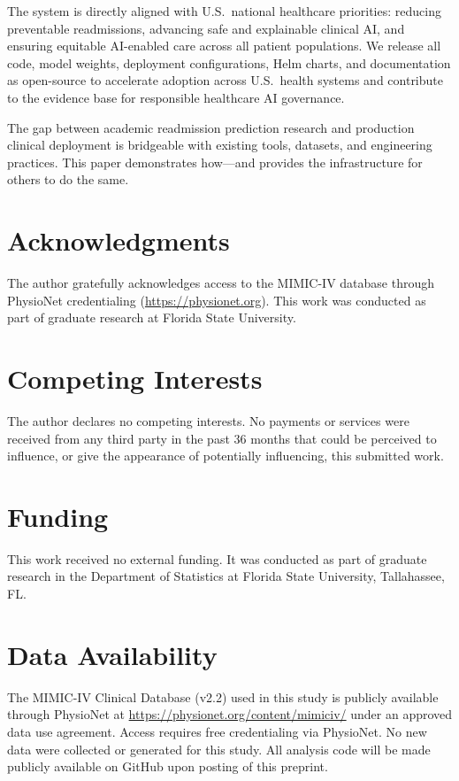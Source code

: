 \documentclass[11pt,letterpaper]{article}
\begin{document}
The system is directly aligned with U.S.\ national healthcare priorities: reducing preventable readmissions, advancing safe and explainable clinical AI, and ensuring equitable AI-enabled care across all patient populations. We release all code, model weights, deployment configurations, Helm charts, and documentation as open-source to accelerate adoption across U.S.\ health systems and contribute to the evidence base for responsible healthcare AI governance.

The gap between academic readmission prediction research and production clinical deployment is bridgeable with existing tools, datasets, and engineering practices. This paper demonstrates how---and provides the infrastructure for others to do the same.

\section*{Acknowledgments}

The author gratefully acknowledges access to the MIMIC-IV database through PhysioNet credentialing (\url{https://physionet.org}). This work was conducted as part of graduate research at Florida State University.

\section*{Competing Interests}
The author declares no competing interests. No payments or services were received from any third party in the past 36 months that could be perceived to influence, or give the appearance of potentially influencing, this submitted work.

\section*{Funding}
This work received no external funding. It was conducted as part of graduate research in the Department of Statistics at Florida State University, Tallahassee, FL.

\section*{Data Availability}
The MIMIC-IV Clinical Database (v2.2) used in this study is publicly available through PhysioNet at \url{https://physionet.org/content/mimiciv/} under an approved data use agreement. Access requires free credentialing via PhysioNet. No new data were collected or generated for this study. All analysis code will be made publicly available on GitHub upon posting of this preprint.
\end{document}
